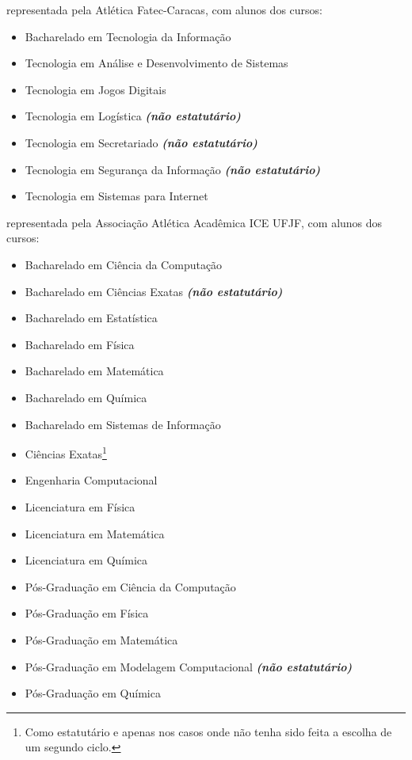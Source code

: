 \begin{article}
\begin{description}[noitemsep]
		\item[Faculdade de Tecnologia - Carapicuíba] representada pela Atlética Fatec-Caracas, com alunos dos cursos:
		\begin{itemize}[noitemsep]
			\item Bacharelado em Tecnologia da Informação
			\item Tecnologia em Análise e Desenvolvimento de Sistemas
			\item Tecnologia em Jogos Digitais
			\item Tecnologia em Logística \textbf{\textit{(não estatutário)}}
			\item Tecnologia em Secretariado \textbf{\textit{(não estatutário)}}
			\item Tecnologia em Segurança da Informação \textbf{\textit{(não estatutário)}}
			\item Tecnologia em Sistemas para Internet
		\end{itemize}

		\item[UFJF] representada pela Associação Atlética Acadêmica ICE UFJF, com alunos dos cursos:
		\begin{itemize}[noitemsep]
			\item Bacharelado em Ciência da Computação
			\item Bacharelado em Ciências Exatas \textbf{\textit{(não estatutário)}}
			\item Bacharelado em Estatística
			\item Bacharelado em Física
			\item Bacharelado em Matemática
			\item Bacharelado em Química
			\item Bacharelado em Sistemas de Informação
			\item Ciências Exatas\footnote{Como estatutário e apenas nos casos onde não tenha sido feita a escolha de um segundo ciclo.}
			\item Engenharia Computacional
			\item Licenciatura em Física
			\item Licenciatura em Matemática
			\item Licenciatura em Química
			\item Pós-Graduação em Ciência da Computação
			\item Pós-Graduação em Física
			\item Pós-Graduação em Matemática
			\item Pós-Graduação em Modelagem Computacional \textbf{\textit{(não estatutário)}}
			\item Pós-Graduação em Química
		\end{itemize}


\end{description}
\end{article}
